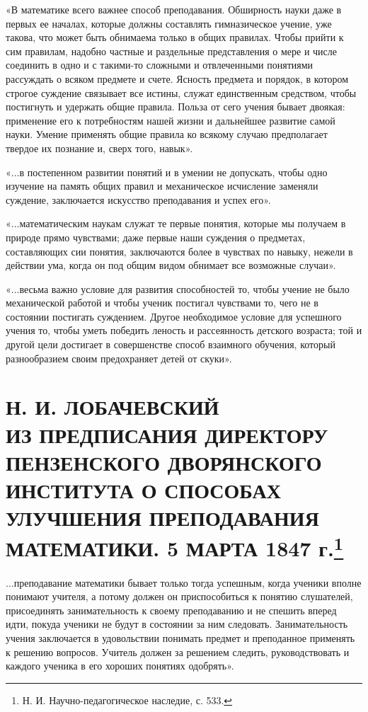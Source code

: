 \documentclass[12pt, a4paper, openany]{book}
\begin{document}
«В математике всего важнее способ преподавания. Обширность науки даже в первых ее началах,  которые должны составлять гимназическое учение, уже  такова, что может быть обнимаема только в общих  правилах. Чтобы прийти к сим правилам, надобно частные и раздельные представления о мере и числе соединить в одно и с такими-то сложными и отвлеченными понятиями рассуждать о всяком предмете и счете. Ясность предмета и порядок, в котором строгое суждение связывает все  истины, служат единственным средством, чтобы постигнуть и удержать общие правила. Польза от сего учения бывает двоякая: применение его к потребностям нашей жизни и дальнейшее развитие самой науки. Умение применять общие правила ко всякому случаю предполагает твердое их познание и, сверх того, навык». 

«...в постепенном развитии понятий и в умении не  допускать, чтобы одно изучение на память общих правил и механическое исчисление заменяли суждение,  заключается искусство преподавания и успех его». 

«...математическим наукам служат те первые понятия, которые мы получаем в природе прямо чувствами; даже первые наши суждения о предметах, составляющих сии понятия, заключаются более в чувствах по навыку, нежели в действии ума, когда он под общим видом обнимает все возможные случаи». 

«...весьма важно условие для развития способностей то, чтобы учение не было механической работой и чтобы ученик постигал чувствами то, чего не в состоянии  постигать суждением. Другое необходимое условие для  успешного учения то, чтобы уметь победить леность и  рассеянность детского возраста; той и другой цели достигает в совершенстве способ взаимного обучения, который  разнообразием своим предохраняет детей от скуки».

\section[\textls{Н. И. Лобачевский}. Из предписания директору пензенского дворянского института о способах улучшения преподавания математики. 5 марта 1847 г.]{{\small Н. И. ЛОБАЧЕВСКИЙ} \\ \textbf{ИЗ ПРЕДПИСАНИЯ ДИРЕКТОРУ ПЕНЗЕНСКОГО ДВОРЯНСКОГО ИНСТИТУТА О СПОСОБАХ УЛУЧШЕНИЯ ПРЕПОДАВАНИЯ МАТЕМАТИКИ. 5 МАРТА 1847 г.{\footnote{ Н. И. Научно-педагогическое наследие, с. 533.}}}}


...преподавание математики бывает только тогда  успешным, когда ученики вполне понимают учителя, а потому должен он приспособиться к понятию слушателей,  присоединять занимательность к своему преподаванию и не  спешить вперед идти, покуда ученики не будут в состоянии за ним следовать. Занимательность учения заключается в удовольствии понимать предмет и преподанное  применять к решению вопросов. Учитель должен за решением следить, руководствовать и каждого ученика в его хороших понятиях одобрять». 
\end{document}
